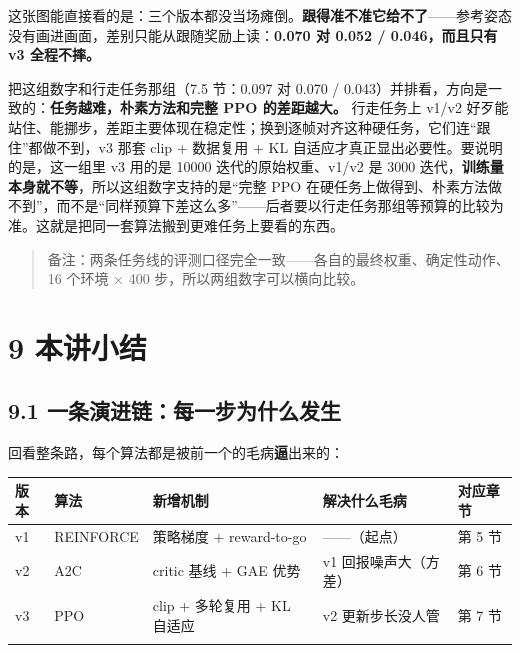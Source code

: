 \documentclass[
  chinese,
]{ctexart}
\begin{document}
这张图能直接看的是：三个版本都没当场瘫倒。\textbf{跟得准不准它给不了}------参考姿态没有画进画面，差别只能从跟随奖励上读：\textbf{0.070
对 0.052 / 0.046，而且只有 v3 全程不摔。}

把这组数字和行走任务那组（7.5 节：0.097 对 0.070 /
0.043）并排看，方向是一致的：\textbf{任务越难，朴素方法和完整 PPO
的差距越大。} 行走任务上 v1/v2
好歹能站住、能挪步，差距主要体现在稳定性；换到逐帧对齐这种硬任务，它们连``跟住''都做不到，v3
那套 clip + 数据复用 + KL 自适应才真正显出必要性。要说明的是，这一组里
v3 用的是 10000 迭代的原始权重、v1/v2 是 3000
迭代，\textbf{训练量本身就不等}，所以这组数字支持的是``完整 PPO
在硬任务上做得到、朴素方法做不到''，而不是``同样预算下差这么多''------后者要以行走任务那组等预算的比较为准。这就是把同一套算法搬到更难任务上要看的东西。

\begin{quote}
备注：两条任务线的评测口径完全一致------各自的最终权重、确定性动作、16
个环境 × 400 步，所以两组数字可以横向比较。
\end{quote}

\section{9 本讲小结}\label{ux672cux8bb2ux5c0fux7ed3}

\subsection{9.1
一条演进链：每一步为什么发生}\label{ux4e00ux6761ux6f14ux8fdbux94feux6bcfux4e00ux6b65ux4e3aux4ec0ux4e48ux53d1ux751f}

回看整条路，每个算法都是被前一个的毛病\textbf{逼}出来的：

\begin{center}
\begin{tabular}{@{}>{\raggedright\arraybackslash}p{} >{\raggedright\arraybackslash}p{} >{\raggedright\arraybackslash}p{} >{\raggedright\arraybackslash}p{} >{\raggedright\arraybackslash}p{}@{}}
\toprule\noalign{}
版本 & 算法 & 新增机制 & 解决什么毛病 & 对应章节 \\
\midrule\noalign{}
v1 & REINFORCE & 策略梯度 + reward-to-go & ------（起点） & 第 5 节 \\
v2 & A2C & critic 基线 + GAE 优势 & v1 回报噪声大（方差） & 第 6 节 \\
v3 & PPO & clip + 多轮复用 + KL 自适应 & v2 更新步长没人管 & 第 7 节 \\
\bottomrule\noalign{}
\end{tabular}
\end{center}
\end{document}

